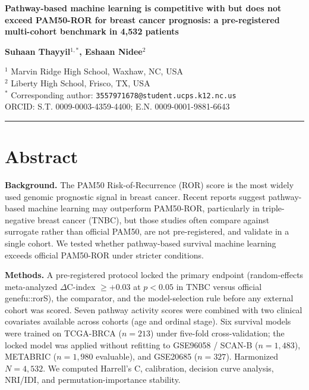 \documentclass[11pt,letterpaper]{article}
\begin{document}

\begin{center}
{\Large\bfseries\color{blue!70!black}
Pathway-based machine learning is competitive with but does not exceed PAM50-ROR for breast cancer prognosis: a pre-registered multi-cohort benchmark in 4,532 patients
\par}
\vspace{1.5em}

\textbf{Suhaan Thayyil$^{1,*}$, Eshaan Nidee$^2$}
\vspace{0.5em}

$^1$ Marvin Ridge High School, Waxhaw, NC, USA \\[0.2em]
$^2$ Liberty High School, Frisco, TX, USA \\[0.2em]
$^*$ Corresponding author: \texttt{3557971678@student.ucps.k12.nc.us} \\[0.2em]
ORCID: S.T. 0009-0003-4359-4400; E.N. 0009-0001-9881-6643
\end{center}

\vspace{1em}
\hrule
\vspace{1em}


\section*{Abstract}

\noindent\textbf{Background.} The PAM50 Risk-of-Recurrence (ROR) score is the most widely used genomic prognostic signal in breast cancer. Recent reports suggest pathway-based machine learning may outperform PAM50-ROR, particularly in triple-negative breast cancer (TNBC), but those studies often compare against surrogate rather than official PAM50, are not pre-registered, and validate in a single cohort. We tested whether pathway-based survival machine learning exceeds official PAM50-ROR under stricter conditions.

\noindent\textbf{Methods.} A pre-registered protocol locked the primary endpoint (random-effects meta-analyzed $\Delta$C-index $\geq +0.03$ at $p < 0.05$ in TNBC versus official genefu::rorS), the comparator, and the model-selection rule before any external cohort was scored. Seven pathway activity scores were combined with two clinical covariates available across cohorts (age and ordinal stage). Six survival models were trained on TCGA-BRCA ($n = 213$) under five-fold cross-validation; the locked model was applied without refitting to GSE96058 / SCAN-B ($n = 1{,}483$), METABRIC ($n = 1{,}980$ evaluable), and GSE20685 ($n = 327$). Harmonized $N = 4{,}532$. We computed Harrell's C, calibration, decision curve analysis, NRI/IDI, and permutation-importance stability.
\end{document}
